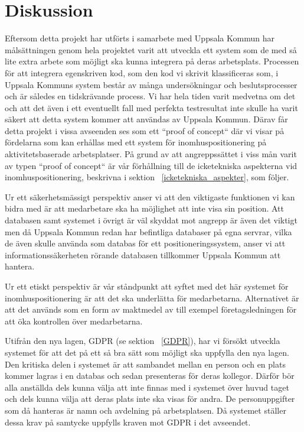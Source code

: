 \documentclass[a4paper,12pt]{article}
\begin{document}
\section{Diskussion}
Eftersom detta projekt har utförts i samarbete med Uppsala Kommun har målsättningen genom hela projektet varit att utveckla ett system som de med så lite extra arbete som möjligt ska kunna integrera på deras arbetsplats. Processen för att integrera egenskriven kod, som den kod vi skrivit klassificeras som, i Uppsala Kommuns system består av många undersökningar och beslutsprocesser och är således en tidskrävande process. Vi har hela tiden varit medvetna om det och att det även i ett eventuellt fall med perfekta testresultat inte skulle ha varit säkert att detta system kommer att användas av Uppsala Kommun. Därav får detta projekt i vissa avseenden ses som ett ``proof of concept`` där vi visar på fördelarna som kan erhållas med ett system för inomhuspositionering på aktivitetsbaserade arbetsplatser. På grund av att angreppssättet i viss mån varit av typen ``proof of concept`` är vår förhållning till de icketekniska aspekterna vid inomhuspositionering, beskrivna i sektion ~\ref{icketekniska_aspekter}, som följer.

Ur ett säkerhetsmässigt perspektiv anser vi att den viktigaste funktionen vi kan bidra med är att medarbetare ska ha möjlighet att inte visa sin position. Att databasen samt systemet i övrigt är väl skyddat mot angrepp är även det viktigt men då Uppsala Kommun redan har befintliga databaser på egna servrar, vilka de även skulle använda som databas för ett positioneringssystem, anser vi att informationssäkerheten rörande databasen tillkommer Uppsala Kommun att hantera.

Ur ett etiskt perspektiv är vår ståndpunkt att syftet med det här systemet för inomhuspositionering är att det ska underlätta för medarbetarna. Alternativet är att det används som en form av maktmedel av till exempel företagsledningen för att öka kontrollen över medarbetarna.

Utifrån den nya lagen, GDPR (se sektion ~\ref{GDPR}), har vi försökt utveckla systemet för att det på ett så bra sätt som möjligt ska uppfylla den nya lagen.  Den kritiska delen i systemet är att sambandet mellan en person och en plats kommer lagras i en databas och sedan presenteras för deras kollegor. Därför bör alla anställda dels kunna välja att inte finnas med i systemet över huvud taget och dels kunna välja att deras plats inte ska visas för andra. De personuppgifter som då hanteras är namn och avdelning på arbetsplatsen. Då systemet ställer dessa krav på samtycke uppfylls kraven mot GDPR i det avseendet.
\end{document}
